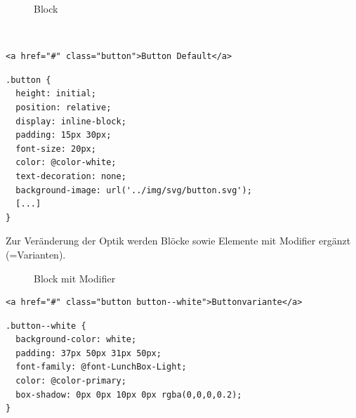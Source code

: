 \begin{figure}[ht]
\caption{Block}
\end{figure}
\\
\begin{lstlisting}[style=htmlcssjs, backgroundcolor = \color{lightgray},
caption=BEM -- Block Default (HTML)] 
<a href="#" class="button">Button Default</a>
\end{lstlisting}

\begin{lstlisting}[style=htmlcssjs, backgroundcolor = \color{lightgray},
caption=BEM -- Block Default (CSS)]
.button {
  height: initial;
  position: relative;
  display: inline-block;
  padding: 15px 30px;
  font-size: 20px;
  color: @color-white;
  text-decoration: none;
  background-image: url('../img/svg/button.svg');
  [...]
}
\end{lstlisting}
\clearpage
Zur Veränderung der Optik werden Blöcke sowie Elemente mit Modifier ergänzt
(=Varianten).

\begin{figure}[ht]
\caption{Block mit Modifier}
\end{figure}

\begin{lstlisting}[style=htmlcssjs, backgroundcolor = \color{lightgray},
caption=BEM -- Block mit Modifier (HTML)]
<a href="#" class="button button--white">Buttonvariante</a>
\end{lstlisting}

\begin{lstlisting}[style=htmlcssjs, backgroundcolor = \color{lightgray},
caption=BEM -- Modifier (CSS)] 
.button--white {
  background-color: white;
  padding: 37px 50px 31px 50px;
  font-family: @font-LunchBox-Light;
  color: @color-primary;
  box-shadow: 0px 0px 10px 0px rgba(0,0,0,0.2);
}

\end{lstlisting}

